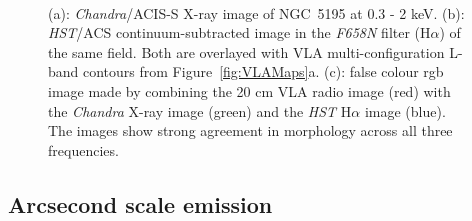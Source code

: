 \documentclass[fleqn,usenatbib]{mnras}
\def\fig{Figure}
\begin{document}



\begin{figure}
{\centering
{} \hspace{2em}
\\

\caption{(a): \textit{Chandra}/ACIS-S X-ray image of NGC~5195 at 0.3 - 2 keV. (b): \textit{HST}/ACS continuum-subtracted image in the \textit{F658N} filter (H$\alpha$) of the same field. Both are overlayed with VLA multi-configuration L-band contours from \fig~\ref{fig:VLAMaps}a. (c): false colour rgb image made by combining the 20 cm VLA radio image (red) with the \textit{Chandra} X-ray image (green) and the \textit{HST} H$\alpha$ image (blue). The images show strong agreement in morphology across all three frequencies.}
\label{fig:VLAHalpha}
}
\end{figure}


\subsection{Arcsecond scale emission }
\end{document}
